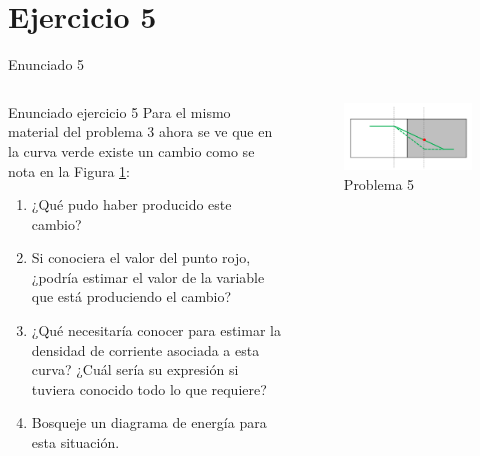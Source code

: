 \documentclass[
    10pt,
    aspectratio=169,
    xcolor={dvipsnames},
    spanish,
    ]{beamer}
\begin{document}
\section{Ejercicio 5}
\begin{frame}{Enunciado 5}
\begin{columns}
  \begin{column}{0.55\textwidth}
    \begin{block}{Enunciado ejercicio 5}
      \scriptsize
      Para el mismo material del problema 3 ahora se ve que en la curva verde existe un cambio como se nota en la Figura \ref{fig:p5}:

      \begin{enumerate}
          \item ¿Qué pudo haber producido este cambio?
          \item Si conociera el valor del punto rojo, ¿podría estimar el valor de la variable que está produciendo el cambio?
          \item ¿Qué necesitaría conocer para estimar la densidad de corriente asociada a esta curva? ¿Cuál sería su expresión si tuviera conocido todo lo que requiere?
          \item Bosqueje un diagrama de energía para esta situación.
      \end{enumerate}
    \end{block}
  \end{column}
  
  \begin{column}{0.43\textwidth}
    \begin{figure}[H]
        \centering
        \includegraphics[width=\textwidth]{../figures/Auxiliar_2_2}
        \caption{Problema 5}
        \label{fig:p5}
    \end{figure}
  \end{column}
\end{columns}
\end{frame}
\end{document}

